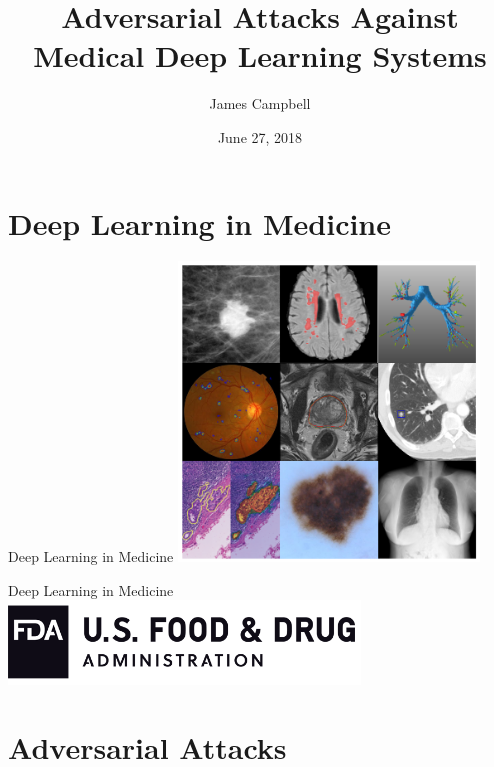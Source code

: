 \documentclass{beamer}
\title{Adversarial Attacks Against Medical Deep Learning Systems}
\date{June 27, 2018}
\author{James Campbell}
\institute{Cardiff University, School of Mathematics}
\begin{document}
\maketitle


\section{Deep Learning in Medicine}

\begin{frame}{Deep Learning in Medicine}
\centering
\includegraphics[width=0.6\textwidth]{./images/medical-deep-learning.png}

\cite{Litjens_Kooi_Bejnordi_Setio_Ciompi_Ghafoorian_van_der_Laak_van_Ginneken_Sánchez_2017}
\end{frame}

\begin{frame}{Deep Learning in Medicine}
\centering
\includegraphics[width=0.7\textwidth]{./images/fda.png}

\cite{Commissioner}
\end{frame}


\section{Adversarial Attacks}
\end{document}

